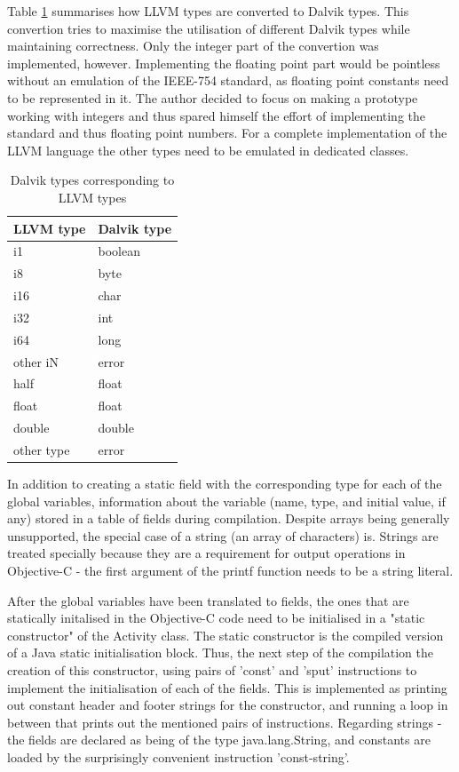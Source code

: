 \documentclass[parskip]{cs4rep}
\begin{document}
Table \ref{tab:typeConvertion} summarises how LLVM types are converted to Dalvik types. This convertion tries to maximise the utilisation of different Dalvik types while maintaining correctness. Only the integer part of the convertion was implemented, however. Implementing the floating point part would be pointless without an emulation of the IEEE-754 standard, as floating point constants need to be represented in it. The author decided to focus on making a prototype working with integers and thus spared himself the effort of implementing the standard and thus floating point numbers. For a complete implementation of the LLVM language the other types need to be emulated in dedicated classes.

\begin{table}[htb]
    \centering
    \begin{tabular}{ | l | l |}
    \hline
    LLVM type & Dalvik type \\ \hline \hline
    i1 & boolean \\ \hline
    i8 & byte \\ \hline
    i16 & char \\ \hline
    i32 & int \\ \hline
    i64 & long \\ \hline
    other iN & error \\ \hline
    half & float \\ \hline
    float & float \\ \hline
    double & double \\ \hline
    other type & error \\ \hline
    \end{tabular}
    \caption{Dalvik types corresponding to LLVM types}
    \label{tab:typeConvertion}
\end{table}

In addition to creating a static field with the corresponding type for each of the global variables, information about the variable (name, type, and initial value, if any) stored in a table of fields during compilation. Despite arrays being generally unsupported, the special case of a string (an array of characters) is. Strings are treated specially because they are a requirement for output operations in Objective-C - the first argument of the printf function needs to be a string literal.

After the global variables have been translated to fields, the ones that are statically initalised in the Objective-C code need to be initialised in a "static constructor" of the Activity class. The static constructor is the compiled version of a Java static initialisation block. Thus, the next step of the compilation the creation of this constructor, using pairs of 'const' and 'sput' instructions to implement the initialisation of each of the fields. This is implemented as printing out constant header and footer strings for the constructor, and running a loop in between that prints out the mentioned pairs of instructions. Regarding strings - the fields are declared as being of the type java.lang.String, and constants are loaded by the surprisingly convenient instruction 'const-string'.
\end{document}
